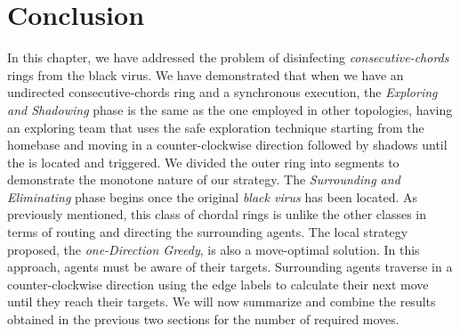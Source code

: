 \section{Conclusion }  




In this chapter, we have addressed the problem of disinfecting {\it consecutive-chords} rings from the black virus. We have demonstrated that when we have an undirected consecutive-chords ring and a synchronous execution, the {\em Exploring and Shadowing} phase is the same as the one employed in other topologies, having an exploring team that uses the safe exploration technique starting from the homebase and moving in a counter-clockwise direction followed by shadows until the \bv is located and triggered. We divided the outer ring into segments to demonstrate the monotone nature of our strategy. The {\em Surrounding and Eliminating} phase begins once the original {\it black virus} has been located. As previously mentioned, this class of chordal rings is unlike the other classes in terms of routing and directing the surrounding agents. The local strategy proposed, the {\it one-Direction Greedy}, is also a move-optimal solution. In this approach, agents must be aware of their targets. Surrounding agents traverse in a counter-clockwise direction using the edge labels to calculate their next move until they reach their targets.  We will now summarize and combine the results obtained in the previous two sections for the number of required moves.
\begin{center}
\end{center}


